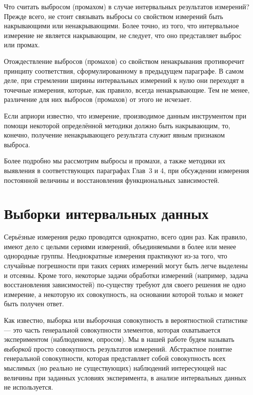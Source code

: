 \documentclass[a5paper,openany]{book}
\begin{document}
Что считать выбросом (промахом) в случае интервальных результатов измерений? 
Прежде всего, не стоит связывать выбросы со свойством измерений быть накрывающими 
или ненакрывающими. Более точно, из того, что интервальное измерение не является 
накрывающим, не следует, что оно представляет выброс или промах. 
   
Отождествление выбросов (промахов) со свойством ненакрывания противоречит 
принципу соответствия, сформулированному в предыдущем параграфе. В самом деле, 
при стремлении ширины интервальных измерений к нулю они переходят в точечные 
измерения, которые, как правило, всегда ненакрывающие. Тем не менее, различение 
для них выбросов (промахов) от этого не исчезает. 
  
Если априори известно, что измерение, производимое данным инструментом при помощи 
некоторой определённой методики должно быть накрывающим, то, конечно, получение 
ненакрывающего результата служит явным признаком выброса. 
   
Более подробно мы рассмотрим выбросы и промахи, а также методики их выявления 
в соответствующих параграфах Глав~3 и 4, при обсуждении измерения постоянной 
величины и восстановления функциональных зависимостей. 
    
  
\section{Выборки интервальных данных} 
\label{InteSampleSect} 
  
  
Серьёзные измерения редко проводятся однократно, всего один раз. Как правило, имеют 
дело с целыми сериями измерений, объединяемыми в более или менее однородные группы. 
Неоднократные измерения практикуют из-за того, что случайные погрешности при таких 
сериях измерений могут быть легче выделены и отсеяны. Кроме того, некоторые задачи 
обработки измерений (например, задача восстановления зависимостей) по-существу 
требуют для своего решения не одно измерение, а некоторую их совокупность, 
на основании которой только и может быть получен ответ. 
  
Как известно, выборка или выборочная совокупность в вероятностной статистике 
--- это часть генеральной совокупности элементов, которая охватывается экспериментом 
(наблюдением, опросом). Мы в нашей работе будем называть \textit{выборкой} просто 
совокупность результатов измерений. Абстрактное понятие генеральной совокупности, 
которая представляет собой совокупность всех мыслимых (но реально не существующих) 
наблюдений интересующей нас величины при заданных условиях эксперимента, в анализе 
интервальных данных не используется.  
  
\end{document}
